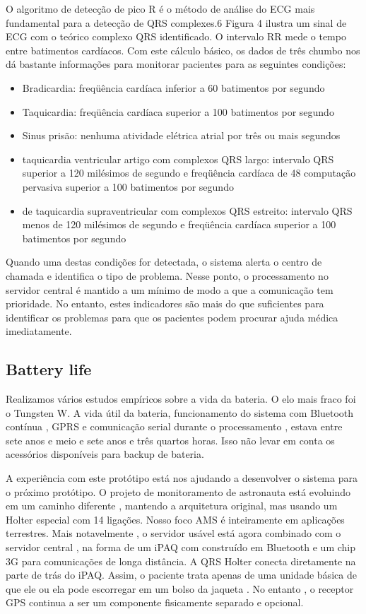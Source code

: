 \documentclass[12pt]{article} %
\begin{document}
O algoritmo de detecção de pico R é o método de análise do ECG mais fundamental para a detecção de QRS complexes.6 Figura 4 ilustra um sinal de ECG com o teórico complexo QRS identificado. O intervalo RR mede o tempo entre batimentos cardíacos. Com este cálculo básico, os dados de três chumbo nos dá bastante informações para monitorar pacientes para as seguintes condições:
\begin{itemize}
	\item Bradicardia: freqüência cardíaca inferior a 60 batimentos por segundo
	\item Taquicardia: freqüência cardíaca superior a 100 batimentos por segundo
	\item Sinus prisão: nenhuma atividade elétrica atrial por três ou mais segundos
	\item taquicardia ventricular artigo com complexos QRS largo: intervalo QRS superior a 120 milésimos de segundo e freqüência cardíaca de 48 computação pervasiva superior a 100 batimentos por segundo
	\item de taquicardia supraventricular com complexos QRS estreito: intervalo QRS menos de 120 milésimos de segundo e freqüência cardíaca superior a 100 batimentos por segundo
\end{itemize}

Quando uma destas condições for detectada, o sistema alerta o centro de chamada e identifica o tipo de problema. Nesse ponto, o processamento no servidor central é mantido a um mínimo de modo a que a comunicação tem prioridade. No entanto, estes indicadores são mais do que suficientes para identificar os problemas para que os pacientes podem procurar ajuda médica imediatamente.


\subsection{Battery life} %

Realizamos vários estudos empíricos sobre a vida da bateria. O elo mais fraco foi o Tungsten W. A vida útil da bateria, funcionamento do sistema com Bluetooth contínua , GPRS e comunicação serial durante o processamento , estava entre sete anos e meio e sete anos e três quartos horas. Isso não levar em conta os acessórios disponíveis para backup de bateria.

A experiência com este protótipo está nos ajudando a desenvolver o sistema para o próximo protótipo. O projeto de monitoramento de astronauta está evoluindo em um caminho diferente , mantendo a arquitetura original, mas usando um Holter especial com 14 ligações. Nosso foco AMS é inteiramente em aplicações terrestres. Mais notavelmente , o servidor usável está agora combinado com o servidor central , na forma de um iPAQ com construído em Bluetooth e um chip 3G para comunicações de longa distância. A QRS Holter conecta diretamente na parte de trás do iPAQ. Assim, o paciente trata apenas de uma unidade básica de que ele ou ela pode escorregar em um bolso da jaqueta . No entanto , o receptor GPS continua a ser um componente fisicamente separado e opcional.
\end{document}
